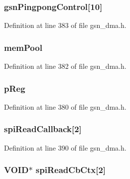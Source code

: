 \hypertarget{a00049_a12a87a72a8c4742ea0b7fac38996d3f7}{
\subsubsection[{gsnPingpongControl}]{ {\bf gsnPingpongControl}\mbox{[}10\mbox{]}}}
\label{a00049_a12a87a72a8c4742ea0b7fac38996d3f7}


Definition at line 383 of file gsn\_\-dma.h.

\hypertarget{a00049_a942be9a68f7697a36a6c971081311d12}{
\subsubsection[{memPool}]{ {\bf memPool}}}
\label{a00049_a942be9a68f7697a36a6c971081311d12}


Definition at line 382 of file gsn\_\-dma.h.

\hypertarget{a00049_a733fb7afbc3bd37a546de0e37c12f150}{
\subsubsection[{pReg}]{ {\bf pReg}}}
\label{a00049_a733fb7afbc3bd37a546de0e37c12f150}


Definition at line 380 of file gsn\_\-dma.h.

\hypertarget{a00049_a17036a9850efdc366d026fa74a76f92b}{
\subsubsection[{spiReadCallback}]{ {\bf spiReadCallback}\mbox{[}2\mbox{]}}}
\label{a00049_a17036a9850efdc366d026fa74a76f92b}


Definition at line 390 of file gsn\_\-dma.h.

\hypertarget{a00049_a310078ceadd325955bf78bccf87e4808}{
\subsubsection[{spiReadCbCtx}]{\setlength{\rightskip}{0pt plus 5cm}VOID$\ast$ {\bf spiReadCbCtx}\mbox{[}2\mbox{]}}}
\label{a00049_a310078ceadd325955bf78bccf87e4808}


